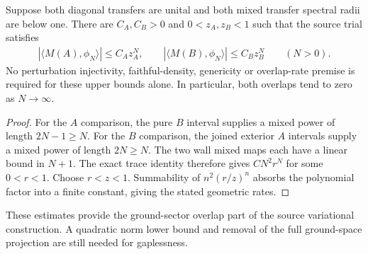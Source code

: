 \begin{lemma}
    \label{thm:uncle_trial_ground_overlap_decay}
    \leanok
    Suppose both diagonal transfers are unital and both mixed transfer
    spectral radii are below one. There are $C_A,C_B>0$ and
    $0<z_A,z_B<1$ such that the source trial satisfies
    \begin{align}
        |\langle M(A),\phi_N\rangle|\le C_Az_A^N,
        \qquad |\langle M(B),\phi_N\rangle|\le C_Bz_B^N
        \qquad (N>0).
    \end{align}
    No perturbation injectivity, faithful-density, genericity or
    overlap-rate premise is required for these upper bounds alone.
    In particular, both overlaps tend to zero as $N\to\infty$.
\end{lemma}
\begin{proof}
    \leanok
    For the $A$ comparison, the pure $B$ interval supplies a mixed power
    of length $2N-1\ge N$. For the $B$ comparison, the joined exterior
    $A$ intervals supply a mixed power of length $2N\ge N$. The two
    wall mixed maps each have a linear bound in $N+1$.
    The exact trace identity therefore gives $CN^2r^N$ for some $0<r<1$.
    Choose $r<z<1$. Summability of $n^2(r/z)^n$ absorbs the polynomial
    factor into a finite constant, giving the stated geometric rates.
\end{proof}

These estimates provide the ground-sector overlap part of the source
variational construction. A quadratic norm lower bound and removal of the
full ground-space projection are still needed for gaplessness.
